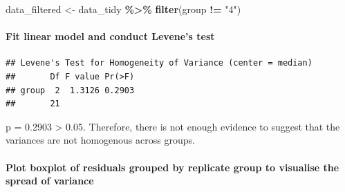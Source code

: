 \documentclass[
]{article}
\newenvironment{Shaded}{\begin{snugshade}}{\end{snugshade}}
\newcommand{\AttributeTok}[1]{\textcolor[rgb]{0.13,0.29,0.53}{#1}}
\newcommand{\FunctionTok}[1]{\textcolor[rgb]{0.13,0.29,0.53}{\textbf{#1}}}
\newcommand{\NormalTok}[1]{#1}
\newcommand{\OtherTok}[1]{\textcolor[rgb]{0.56,0.35,0.01}{#1}}
\newcommand{\SpecialCharTok}[1]{\textcolor[rgb]{0.81,0.36,0.00}{\textbf{#1}}}
\newcommand{\StringTok}[1]{\textcolor[rgb]{0.31,0.60,0.02}{#1}}
\begin{document}
\begin{Shaded}
\begin{Highlighting}[]
\NormalTok{data\_filtered }\OtherTok{\textless{}{-}}\NormalTok{ data\_tidy }\SpecialCharTok{\%\textgreater{}\%} \FunctionTok{filter}\NormalTok{(group }\SpecialCharTok{!=} \StringTok{"4"}\NormalTok{)}
\end{Highlighting}
\end{Shaded}

\paragraph{Fit linear model and conduct Levene's
test}\label{fit-linear-model-and-conduct-levenes-test}

\begin{Shaded}
\end{Shaded}

\begin{verbatim}
## Levene's Test for Homogeneity of Variance (center = median)
##       Df F value Pr(>F)
## group  2  1.3126 0.2903
##       21
\end{verbatim}

p = 0.2903 \textgreater{} 0.05. Therefore, there is not enough evidence
to suggest that the variances are not homogenous across groups.

\paragraph{Plot boxplot of residuals grouped by replicate group to
visualise the spread of
variance}\label{plot-boxplot-of-residuals-grouped-by-replicate-group-to-visualise-the-spread-of-variance}

\begin{Shaded}
\end{Shaded}
\end{document}
